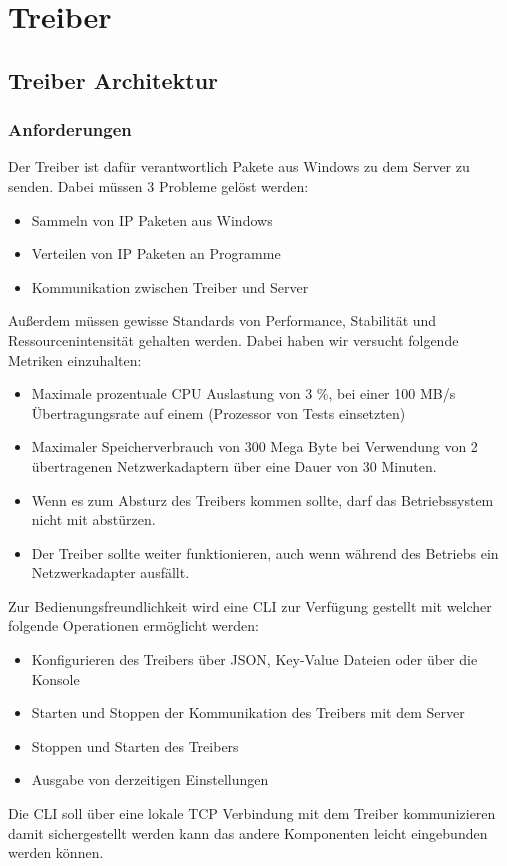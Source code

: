 \chapter{Treiber}
\label{chap:Treiber}

\section{Treiber Architektur}
\subsection{Anforderungen}
Der Treiber ist dafür verantwortlich Pakete aus Windows zu dem Server zu senden. Dabei müssen 3 Probleme gelöst werden:
\begin{itemize}
    \item Sammeln von IP Paketen aus Windows
    \item Verteilen von IP Paketen an Programme
    \item Kommunikation zwischen Treiber und Server
\end{itemize}
Außerdem müssen gewisse Standards von Performance, Stabilität und Ressourcenintensität gehalten werden. Dabei haben wir versucht folgende Metriken einzuhalten:
\begin{itemize}
    \item Maximale prozentuale CPU Auslastung von 3 \%, bei einer 100 MB/s Übertragungsrate auf einem (Prozessor von Tests einsetzten)
    \item Maximaler Speicherverbrauch von 300 Mega Byte bei Verwendung von 2 übertragenen Netzwerkadaptern über eine Dauer von 30 Minuten.
    \item Wenn es zum Absturz des Treibers kommen sollte, darf das Betriebssystem nicht mit abstürzen.
    \item Der Treiber sollte weiter funktionieren, auch wenn während des Betriebs ein Netzwerkadapter ausfällt.
\end{itemize}
Zur Bedienungsfreundlichkeit wird eine CLI zur Verfügung gestellt mit welcher folgende Operationen ermöglicht werden:
\begin{itemize}
    \item Konfigurieren des Treibers über JSON, Key-Value Dateien oder über die Konsole
    \item Starten und Stoppen der Kommunikation des Treibers mit dem Server
    \item Stoppen und Starten des Treibers
    \item Ausgabe von derzeitigen Einstellungen
\end{itemize}
Die CLI soll über eine lokale TCP Verbindung mit dem Treiber kommunizieren damit sichergestellt werden kann das andere Komponenten leicht eingebunden werden können.
\newpage
